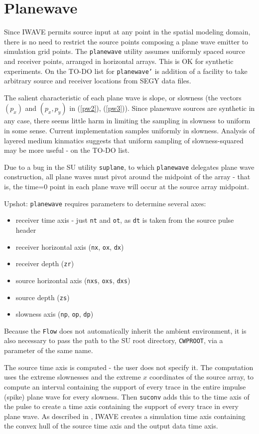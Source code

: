 \section{Planewave}
Since IWAVE permits source input at any point in the spatial modeling domain, there is no need to restrict the source points composing a plane wave emitter to simulation grid points. The {\tt planewave} utility assumes uniformly spaced source and receiver points, arranged in horizontal arrays. This is OK for synthetic experiments. On the TO-DO list for {\tt planewave'} is addition of a facility to take arbitrary source and receiver locations from SEGY data files. 

The salient characteristic of each plane wave is slope, or slowness (the vectors $(p_x)$ and $(p_x,p_y)$ in (\ref{pw2}), (\ref{pw3})). Since planewave sources are synthetic in any case, there seems little harm in limiting the sampling in slowness to uniform in some sense. Current implementation samples uniformly in slowness. Analysis of layered medium kinmatics suggests that uniform sampling of slowness-squared may be more useful - on the TO-DO list.

Due to a bug in the SU utility {\tt suplane}, to which {\tt planewave} delegates plane wave construction, all  plane waves must pivot around the midpoint of the array - that is, the time=0 point in each plane wave will occur at the source array midpoint.

Upshot: {\tt planewave} requires parameters to determine several axes:

\begin{itemize}
\item receiver time axis - just {\tt nt} and {\tt ot}, as {\tt dt} is taken from the source pulse header
\item receiver horizontal axis ({\tt nx}, {\tt ox}, {\tt dx})
\item receiver depth ({\tt zr})
\item source horizontal axis ({\tt nxs}, {\tt oxs}, {\tt dxs})
\item source depth ({\tt zs})
\item slowness axis ({\tt np}, {\tt op}, {\tt dp})
\end{itemize}

Because the {\tt Flow} does not automatically inherit the ambient environment, it is also necessary to pass the path to the SU root directory, {\tt CWPROOT}, via a parameter of the same name.

The source time axis is computed - the user does not specify it. The computation uses the extreme slownesses and the extreme $x$ coordinates of the source array, to compute an interval containing the support of every trace in the entire impulse (spike) plane wave for every slowness. Then {\tt suconv} adds this to the time axis of the pulse to create a time axis containing the support of every trace in every plane wave. As described in \cite[]{trip14:struct}, IWAVE creates a simulation time axis containing the convex hull of the source time axis and the output data time axis.

